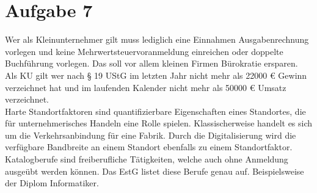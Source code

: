 \documentclass{article}
\begin{document}
	\section*{Aufgabe 7}
	Wer als Kleinunternehmer gilt muss lediglich eine Einnahmen Ausgabenrechnung vorlegen und keine Mehrwertsteuervoranmeldung einreichen oder doppelte Buchführung vorlegen. Das soll vor allem kleinen Firmen Bürokratie ersparen. Als KU gilt wer nach § 19 UStG im letzten Jahr nicht mehr als 22000 € Gewinn verzeichnet hat und im laufenden Kalender nicht mehr als 50000 € Umsatz verzeichnet. \\
	Harte Standortfaktoren sind quantifizierbare Eigenschaften eines Standortes, die für unternehmerisches Handeln eine Rolle spielen. Klassischerweise handelt es sich um die Verkehrsanbindung für eine Fabrik. Durch die Digitalisierung wird die verfügbare Bandbreite an einem Standort ebenfalls zu einem Standortfaktor. \\
	Katalogberufe sind freiberufliche Tätigkeiten, welche auch ohne Anmeldung ausgeübt werden können. Das EstG listet diese Berufe genau auf. Beispielsweise der Diplom Informatiker.
\end{document}
